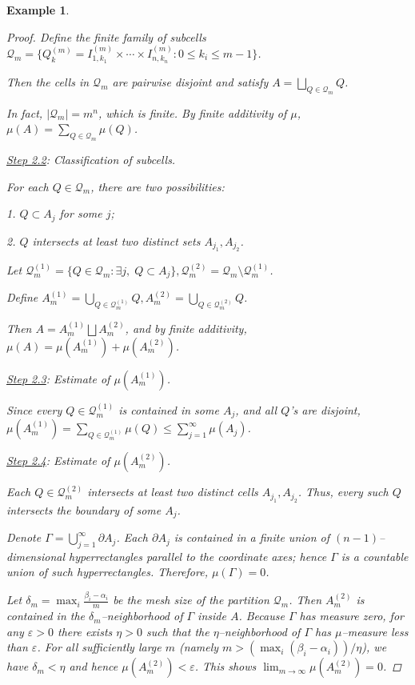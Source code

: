 \documentclass[12pt]{article}
\theoremstyle{blueplain}
\theoremstyle{bluedef}
\theoremstyle{blueremark}
\newtheorem{example}{Example}[section]
\numberwithin{equation}{section}
\begin{document}
\begin{example}
\begin{enumerate}
\begin{proof}
            Define the finite family of subcells $\mathcal{Q}_m = \Big\{ Q_{k}^{(m)} = I^{(m)}_{1,k_1} \times \cdots \times I^{(m)}_{n,k_n} : 0 \le k_i \le m-1 \Big\}$.

            Then the cells in $\mathcal{Q}_m$ are pairwise disjoint and satisfy $A = \bigsqcup_{Q \in \mathcal{Q}_m} Q$.

            In fact, $|\mathcal{Q}_m| = m^n$, which is finite. By finite additivity of $\mu$, $\mu(A) = \sum_{Q \in \mathcal{Q}_m} \mu(Q)$.

            \underline{Step 2.2}: Classification of subcells.

            For each $Q \in \mathcal{Q}_m$, there are two possibilities:

            1. $Q \subset A_j$ for some $j$;

            2. $Q$ intersects at least two distinct sets $A_{j_1}, A_{j_2}$.

            Let $\mathcal{Q}_m^{(1)} = \{ Q \in \mathcal{Q}_m : \exists j,\; Q \subset A_j \}, \mathcal{Q}_m^{(2)} = \mathcal{Q}_m \setminus \mathcal{Q}_m^{(1)}$.

            Define $A_m^{(1)} = \bigcup_{Q \in \mathcal{Q}_m^{(1)}} Q, A_m^{(2)} = \bigcup_{Q \in \mathcal{Q}_m^{(2)}} Q$.

            Then $A = A_m^{(1)} \bigsqcup A_m^{(2)}$, and by finite additivity, $\mu(A) = \mu(A_m^{(1)}) + \mu(A_m^{(2)})$.

            \underline{Step 2.3}: Estimate of $\mu(A_m^{(1)})$.

            Since every $Q \in \mathcal{Q}_m^{(1)}$ is contained in some $A_j$, and all $Q$’s are disjoint,
            $\mu(A_m^{(1)}) = \sum_{Q \in \mathcal{Q}_m^{(1)}} \mu(Q) \le \sum_{j=1}^{\infty} \mu(A_j)$.

            \underline{Step 2.4}: Estimate of $\mu(A_m^{(2)})$.

            Each $Q \in \mathcal{Q}_m^{(2)}$ intersects at least two distinct cells $A_{j_1}, A_{j_2}$. Thus, every such $Q$ intersects the boundary of some $A_j$.

            Denote $\Gamma = \bigcup_{j=1}^{\infty} \partial A_j$. Each $\partial A_j$ is contained in a finite union of $(n-1)$–dimensional hyperrectangles parallel to the coordinate axes; hence $\Gamma$ is a countable union of such hyperrectangles. Therefore, $\mu(\Gamma) = 0$.

            Let $\delta_m = \max_i \frac{\beta_i-\alpha_i}{m}$ be the mesh size of the partition $\mathcal{Q}_m$. Then $A_m^{(2)}$ is contained in the $\delta_m$–neighborhood of $\Gamma$ inside $A$. Because $\Gamma$ has measure zero, for any $\varepsilon > 0$ there exists $\eta > 0$ such that the $\eta$–neighborhood of $\Gamma$ has $\mu$–measure less than $\varepsilon$. For all sufficiently large $m$ (namely $m > (\max_i (\beta_i-\alpha_i))/\eta$), we have $\delta_m < \eta$ and hence $\mu(A_m^{(2)}) < \varepsilon$. This shows $\lim_{m \to \infty} \mu(A_m^{(2)}) = 0$.


\end{proof}
\end{enumerate}
\end{example}
\end{document}
